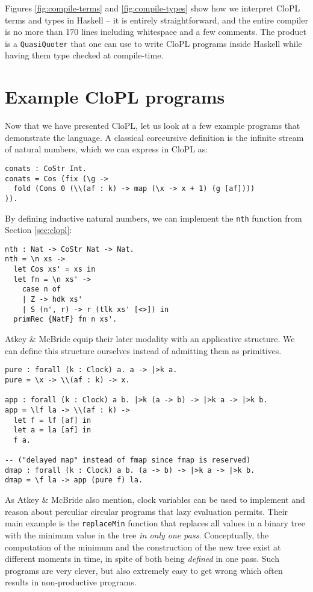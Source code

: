 \documentclass[sigplan,9pt,review]{acmart}\settopmatter{printfolios=true,printccs=false,printacmref=false}
\newcommand{\clopl}{\textsf{CloPL}\xspace}
\newcommand{\code}[1]{\texttt{#1}}
\begin{document}
Figures \ref{fig:compile-terms} and \ref{fig:compile-types} show how we interpret \clopl
terms and types in Haskell -- it is entirely straightforward, and the entire compiler
is no more than 170 lines including whitespace and a few comments. The product is a
\code{QuasiQuoter} that one can use to write \clopl programs inside Haskell while having
them type checked at compile-time.

\section{Example \clopl programs}
Now that we have presented \clopl, let us look at a few example programs that demonstrate
the language. A classical corecursive definition is the infinite stream of natural numbers,
which we can express in \clopl as:

\begin{verbatim}
conats : CoStr Int.
conats = Cos (fix (\g ->
  fold (Cons 0 (\\(af : k) -> map (\x -> x + 1) (g [af])))
)).
\end{verbatim}

By defining inductive natural numbers, we can implement the \code{nth} function from
Section \ref{sec:clopl}:

\begin{verbatim}
nth : Nat -> CoStr Nat -> Nat.
nth = \n xs ->
  let Cos xs' = xs in
  let fn = \n xs' ->
    case n of
    | Z -> hdk xs'
    | S (n', r) -> r (tlk xs' [<>]) in
  primRec {NatF} fn n xs'.
\end{verbatim}

Atkey \& McBride \cite{atkey2013productive} equip their later modality with an applicative
structure. We can define this structure ourselves instead of admitting them as primitives.

\begin{verbatim}
pure : forall (k : Clock) a. a -> |>k a.
pure = \x -> \\(af : k) -> x.

app : forall (k : Clock) a b. |>k (a -> b) -> |>k a -> |>k b.
app = \lf la -> \\(af : k) ->
  let f = lf [af] in
  let a = la [af] in
  f a.

-- ("delayed map" instead of fmap since fmap is reserved)
dmap : forall (k : Clock) a b. (a -> b) -> |>k a -> |>k b.
dmap = \f la -> app (pure f) la.
\end{verbatim}

As Atkey \& McBride \cite{atkey2013productive} also mention, clock variables can be used
to implement and reason about perculiar circular programs that lazy evaluation permits.
Their main example is the \code{replaceMin} function that replaces all values in a binary
tree with the minimum value in the tree \emph{in only one pass}. Conceptually, the
computation of the minimum and the construction of the new tree exist at different moments
in time, in spite of both being \emph{defined} in one pass. Such programs are very
clever, but also extremely easy to get wrong which often results in non-productive programs.
\end{document}
